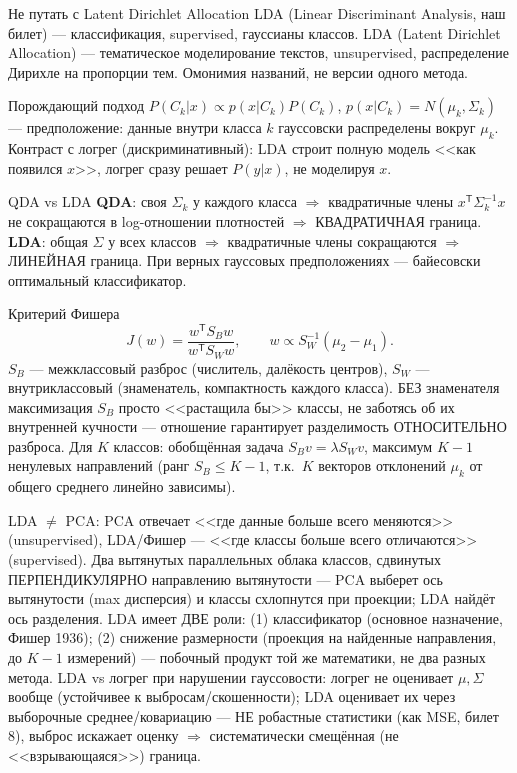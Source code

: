 \documentclass[12pt, a4paper]{article}
\newcommand{\tr}{^{\mathsf{T}}}
\begin{document}
\begin{rembox}{Не путать с Latent Dirichlet Allocation}
LDA (Linear Discriminant Analysis, наш билет) --- классификация, supervised, гауссианы классов. LDA (Latent Dirichlet Allocation) --- тематическое моделирование текстов, unsupervised, распределение Дирихле на пропорции тем. Омонимия названий, не версии одного метода.
\end{rembox}

\begin{defbox}{Порождающий подход}
$P(C_k|x)\propto p(x|C_k)P(C_k)$, $p(x|C_k)=N(\mu_k,\Sigma_k)$ --- предположение: данные внутри класса $k$ гауссовски распределены вокруг $\mu_k$. Контраст с логрег (дискриминативный): LDA строит полную модель <<как появился $x$>>, логрег сразу решает $P(y|x)$, не моделируя $x$.
\end{defbox}

\begin{propbox}{QDA vs LDA}
\textbf{QDA}: своя $\Sigma_k$ у каждого класса $\Rightarrow$ квадратичные члены $x\tr\Sigma_k^{-1}x$ не сокращаются в log-отношении плотностей $\Rightarrow$ КВАДРАТИЧНАЯ граница. \textbf{LDA}: общая $\Sigma$ у всех классов $\Rightarrow$ квадратичные члены сокращаются $\Rightarrow$ ЛИНЕЙНАЯ граница. При верных гауссовых предположениях --- байесовски оптимальный классификатор.
\end{propbox}

\begin{proofbox}{Критерий Фишера}
\[
  J(w)=\frac{w\tr S_B w}{w\tr S_W w}, \qquad w \propto S_W^{-1}(\mu_2-\mu_1).
\]
$S_B$ --- межклассовый разброс (числитель, далёкость центров), $S_W$ --- внутриклассовый (знаменатель, компактность каждого класса). БЕЗ знаменателя максимизация $S_B$ просто <<растащила бы>> классы, не заботясь об их внутренней кучности --- отношение гарантирует разделимость ОТНОСИТЕЛЬНО разброса.
Для $K$ классов: обобщённая задача $S_B v=\lambda S_W v$, максимум $K-1$ ненулевых направлений (ранг $S_B\le K-1$, т.к.\ $K$ векторов отклонений $\mu_k$ от общего среднего линейно зависимы).
\end{proofbox}

\begin{fishkabox}
LDA $\ne$ PCA: PCA отвечает <<где данные больше всего меняются>> (unsupervised), LDA/Фишер --- <<где классы больше всего отличаются>> (supervised). Два вытянутых параллельных облака классов, сдвинутых ПЕРПЕНДИКУЛЯРНО направлению вытянутости --- PCA выберет ось вытянутости (max дисперсия) и классы схлопнутся при проекции; LDA найдёт ось разделения.
LDA имеет ДВЕ роли: (1) классификатор (основное назначение, Фишер 1936); (2) снижение размерности (проекция на найденные направления, до $K-1$ измерений) --- побочный продукт той же математики, не два разных метода.
LDA vs логрег при нарушении гауссовости: логрег не оценивает $\mu,\Sigma$ вообще (устойчивее к выбросам/скошенности); LDA оценивает их через выборочные среднее/ковариацию --- НЕ робастные статистики (как MSE, билет 8), выброс искажает оценку $\Rightarrow$ систематически смещённая (не <<взрывающаяся>>) граница.
\end{fishkabox}
\end{document}
